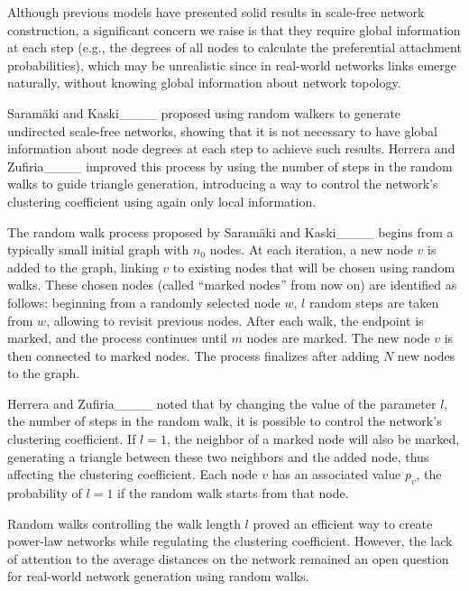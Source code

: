 Although previous models have presented solid results in scale-free network construction, a significant concern we raise is that they require global information at each step (e.g., the degrees of all nodes to calculate the preferential attachment probabilities), which may be unrealistic since in real-world networks links emerge naturally, without knowing global information about network topology. 

Saramäki and Kaski____ proposed using random walkers to generate undirected scale-free networks, showing that it is not necessary to have global information about node degrees at each step to achieve such results. 
Herrera and Zufiria____ improved this process by using the number of steps in the random walks to guide triangle generation, introducing a way to control the network's clustering coefficient using again only local information. 





The random walk process proposed by Saramäki and Kaski____ begins from a typically small initial graph with $n_0$ nodes. At each iteration, a new node $v$ is added to the graph, linking $v$ to existing nodes that will be chosen using random walks. 
These chosen nodes (called ``marked nodes'' from now on) are identified as follows: beginning from a randomly selected node $w$, $l$ random steps are taken from $w$, allowing to revisit previous nodes. After each walk, the endpoint is marked, and the process continues until $m$ nodes are marked. The new node $v$ is then connected to marked nodes. The process finalizes after adding $N$ new nodes to the graph. 

Herrera and Zufiria____ noted that by changing the value of the parameter $l$, the number of steps in the random walk, it is possible to control the network's clustering coefficient. If $l = 1$, the neighbor of a marked node will also be marked, generating a triangle between these two neighbors and the added node, thus affecting the clustering coefficient. Each node $v$ has an associated value $p_v$, the probability of $l = 1$ if the random walk starts from that node. %

Random walks controlling the walk length $l$ proved an efficient way to create power-law networks while regulating the clustering coefficient. However, the lack of attention to the average distances on the network remained an open question for real-world network generation using random walks.